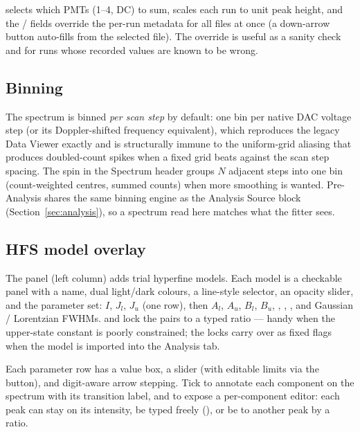  selects which PMTs (1--4, DC) to sum, 
scales each run to unit peak height, and the  /
 fields override the per-run metadata for all
files at once (a down-arrow button auto-fills from the selected
file). The override is useful as a sanity check and for runs whose
recorded values are known to be wrong.

\subsection{Binning}
\label{sec:pa_binning}

The spectrum is binned \emph{per scan step} by default: one bin per
native DAC voltage step (or its Doppler-shifted frequency
equivalent), which reproduces the legacy Data Viewer exactly and is
structurally immune to the uniform-grid aliasing that produces
doubled-count spikes when a fixed grid beats against the scan step
spacing. The  spin in the Spectrum header
groups $N$ adjacent steps into one bin (count-weighted centres,
summed counts) when more smoothing is wanted. Pre-Analysis shares the
same binning engine as the Analysis Source block
(Section~\ref{sec:analysis}), so a spectrum read here matches what
the fitter sees.

\subsection{HFS model overlay}

The  panel (left column) adds trial hyperfine
models. Each model is a checkable panel with a name, dual
light/dark colours, a line-style selector, an opacity slider, and
the parameter set: $I$, $J_l$, $J_u$ (one row), then $A_l$, $A_u$,
$B_l$, $B_u$, , , , and Gaussian /
Lorentzian FWHMs.  and  lock the pairs
to a typed ratio --- handy when the upper-state constant is poorly
constrained; the locks carry over as fixed flags when the model is
imported into the Analysis tab.

Each parameter row has a value box, a slider (with editable limits
via the \app{\dots} button), and digit-aware arrow stepping. Tick
 to annotate each component on the spectrum with its
transition label, and  to expose a per-component
editor: each peak can stay on its  intensity, be typed
freely (), or be  to another peak by a ratio.

